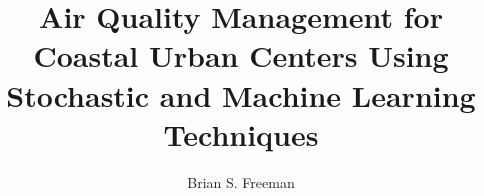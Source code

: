 
\title{Air Quality Management for Coastal Urban Centers Using Stochastic and Machine Learning Techniques}

%
\author{Brian S. Freeman}
%
%
%
%

\chair{  }
%
\othermembers{ }
%
%


\maketitle



